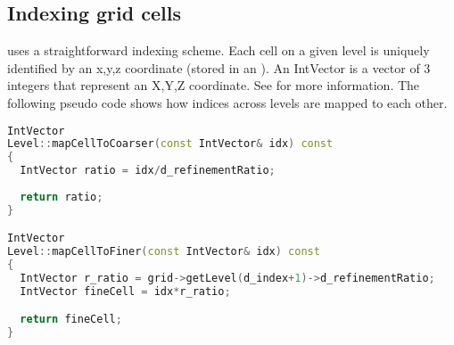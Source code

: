 \subsection{Indexing grid cells}
\Vaango uses a straightforward indexing scheme. Each cell on a given level is 
uniquely identified by an x,y,z coordinate (stored in an ).  
An IntVector is a vector of 3 integers that represent an X,Y,Z coordinate.  
See  for more information.  The following pseudo 
code shows how indices across levels are mapped to each other.

\begin{lstlisting}[language=Cpp]
IntVector
Level::mapCellToCoarser(const IntVector& idx) const
{ 
  IntVector ratio = idx/d_refinementRatio;
  
  return ratio;
}

IntVector
Level::mapCellToFiner(const IntVector& idx) const
{
  IntVector r_ratio = grid->getLevel(d_index+1)->d_refinementRatio;
  IntVector fineCell = idx*r_ratio;

  return fineCell;
}
\end{lstlisting}





